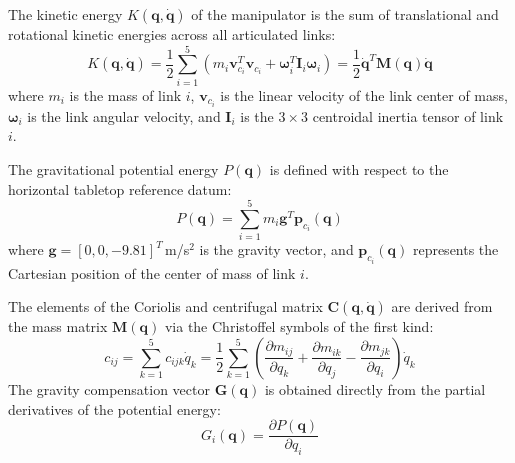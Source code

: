 \documentclass[journal]{IEEEtran}
\begin{document}
The kinetic energy $K(\mathbf{q}, \dot{\mathbf{q}})$ of the manipulator is the sum of translational and rotational kinetic energies across all articulated links:
\begin{equation}
K(\mathbf{q}, \dot{\mathbf{q}}) = \frac{1}{2} \sum_{i=1}^5 \left( m_i \mathbf{v}_{c_i}^T \mathbf{v}_{c_i} + \boldsymbol{\omega}_i^T \mathbf{I}_i \boldsymbol{\omega}_i \right) = \frac{1}{2} \dot{\mathbf{q}}^T \mathbf{M}(\mathbf{q}) \dot{\mathbf{q}}
\end{equation}
where $m_i$ is the mass of link $i$, $\mathbf{v}_{c_i}$ is the linear velocity of the link center of mass, $\boldsymbol{\omega}_i$ is the link angular velocity, and $\mathbf{I}_i$ is the $3\times3$ centroidal inertia tensor of link $i$.

The gravitational potential energy $P(\mathbf{q})$ is defined with respect to the horizontal tabletop reference datum:
\begin{equation}
P(\mathbf{q}) = \sum_{i=1}^5 m_i \mathbf{g}^T \mathbf{p}_{c_i}(\mathbf{q})
\end{equation}
where $\mathbf{g} = [0, 0, -9.81]^T$\,m/s$^2$ is the gravity vector, and $\mathbf{p}_{c_i}(\mathbf{q})$ represents the Cartesian position of the center of mass of link $i$.

The elements of the Coriolis and centrifugal matrix $\mathbf{C}(\mathbf{q}, \dot{\mathbf{q}})$ are derived from the mass matrix $\mathbf{M}(\mathbf{q})$ via the Christoffel symbols of the first kind:
\begin{equation}
c_{ij} = \sum_{k=1}^5 c_{ijk} \dot{q}_k = \frac{1}{2} \sum_{k=1}^5 \left( \frac{\partial m_{ij}}{\partial q_k} + \frac{\partial m_{ik}}{\partial q_j} - \frac{\partial m_{jk}}{\partial q_i} \right) \dot{q}_k
\end{equation}
The gravity compensation vector $\mathbf{G}(\mathbf{q})$ is obtained directly from the partial derivatives of the potential energy:
\begin{equation}
G_i(\mathbf{q}) = \frac{\partial P(\mathbf{q})}{\partial q_i}
\end{equation}
\end{document}
